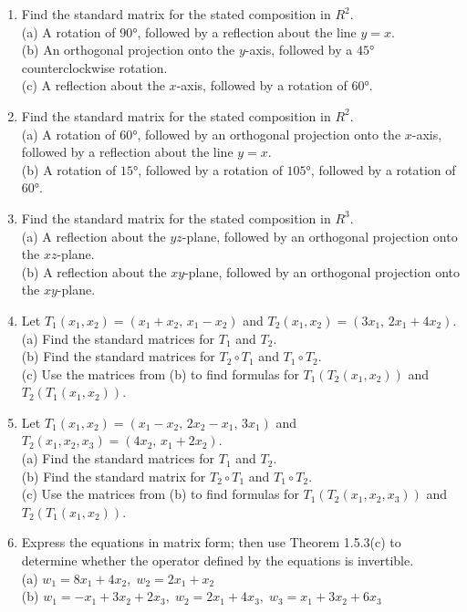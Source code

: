 \documentclass{article}
\theoremstyle{mystyle}
\begin{document}
\begin{enumerate}
\item[7.] Find the standard matrix for the stated composition in $R^2$.\\
(a) A rotation of $90°$, followed by a reflection about the line $y=x$.\\
(b) An orthogonal projection onto the $y$-axis, followed by a $45°$ counterclockwise rotation.\\
(c) A reflection about the $x$-axis, followed by a rotation of $60°$.

\item[8.] Find the standard matrix for the stated composition in $R^2$.\\
(a) A rotation of $60°$, followed by an orthogonal projection onto the $x$-axis, followed by a reflection about the line $y=x$.\\
(b) A rotation of $15°$, followed by a rotation of $105°$, followed by a rotation of $60°$.

\item[9.] Find the standard matrix for the stated composition in $R^3$.\\
(a) A reflection about the $yz$-plane, followed by an orthogonal projection onto the $xz$-plane.\\
(b) A reflection about the $xy$-plane, followed by an orthogonal projection onto the $xy$-plane.

\item[11.] Let $T_1(x_1,x_2)=(x_1+x_2,\,x_1-x_2)$ and $T_2(x_1,x_2)=(3x_1,\,2x_1+4x_2)$.\\
(a) Find the standard matrices for $T_1$ and $T_2$.\\
(b) Find the standard matrices for $T_2\circ T_1$ and $T_1\circ T_2$.\\
(c) Use the matrices from (b) to find formulas for $T_1(T_2(x_1,x_2))$ and $T_2(T_1(x_1,x_2))$.

\item[13.] Let $T_1(x_1,x_2)=(x_1-x_2,\,2x_2-x_1,\,3x_1)$ and $T_2(x_1,x_2,x_3)=(4x_2,\,x_1+2x_2)$.\\
(a) Find the standard matrices for $T_1$ and $T_2$.\\
(b) Find the standard matrix for $T_2\circ T_1$ and $T_1\circ T_2$.\\
(c) Use the matrices from (b) to find formulas for $T_1(T_2(x_1,x_2,x_3))$ and $T_2(T_1(x_1,x_2))$.

\item[17.] Express the equations in matrix form; then use Theorem 1.5.3(c) to determine whether the operator defined by the equations is invertible.\\
(a) $w_1=8x_1+4x_2,\; w_2=2x_1+x_2$\\
(b) $w_1=-x_1+3x_2+2x_3,\; w_2=2x_1+4x_3,\; w_3=x_1+3x_2+6x_3$


\end{enumerate}
\end{document}
